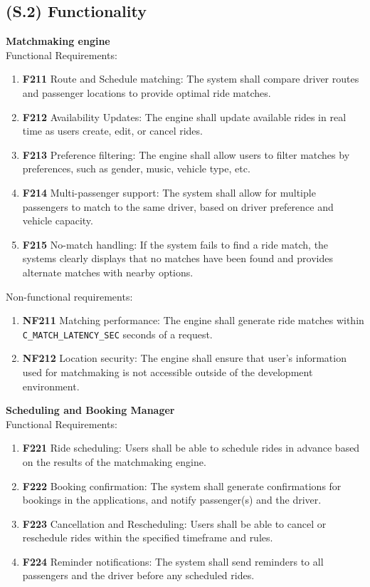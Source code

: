 \documentclass[12pt,letterpaper]{article}
\begin{document}
\subsection{(S.2) Functionality}
\textbf{Matchmaking engine} \\
\noindent Functional Requirements:
\begin{enumerate}
  \item \textbf{F211} Route and Schedule matching: The system shall compare driver routes and passenger locations to provide optimal ride matches.
  \item \textbf{F212} Availability Updates: The engine shall update available rides in real time as users create, edit, or cancel rides.
  \item \textbf{F213} Preference filtering: The engine shall allow users to filter matches by preferences, such as gender, music, vehicle type, etc.
  \item \textbf{F214} Multi-passenger support: The system shall allow for multiple passengers to match to the same driver, based on driver preference and vehicle capacity.
  \item \textbf{F215} No-match handling: If the system fails to find a ride match, the systems clearly displays that no matches have been found and provides alternate matches with nearby options.
\end{enumerate}
Non-functional requirements:
\begin{enumerate}
  \item \textbf{NF211} Matching performance: The engine shall generate ride matches within \texttt{C\_MATCH\_LATENCY\_SEC} seconds of a request.
  \item \textbf{NF212} Location security: The engine shall ensure that user’s information used for matchmaking is not accessible outside of the development environment.
\end{enumerate}
\vspace{1em}
\noindent \textbf{Scheduling and Booking Manager} \\ 
Functional Requirements:
\begin{enumerate}
  \item \textbf{F221} Ride scheduling: Users shall be able to schedule rides in advance based on the results of the matchmaking engine.
  \item \textbf{F222} Booking confirmation: The system shall generate confirmations for bookings in the applications, and notify passenger(s) and the driver.
  \item \textbf{F223} Cancellation and Rescheduling: Users shall be able to cancel or reschedule rides within the specified timeframe and rules.
  \item \textbf{F224} Reminder notifications: The system shall send reminders to all passengers and the driver before any scheduled rides.
\end{enumerate} 
\end{document}
